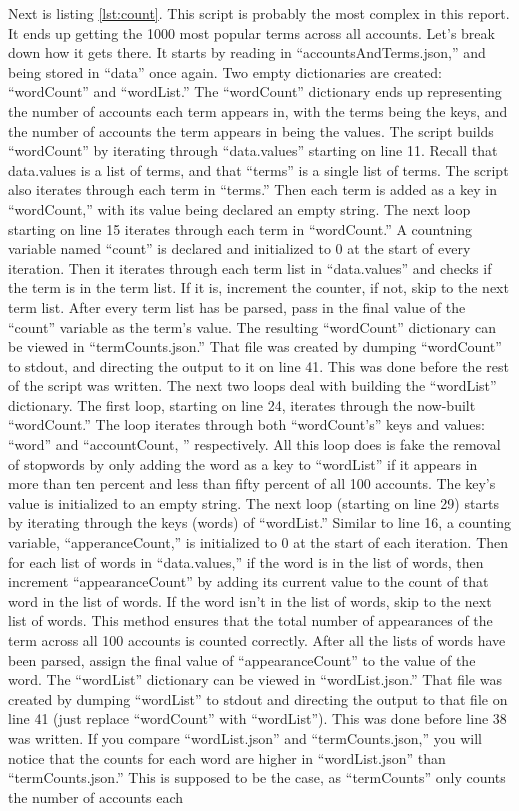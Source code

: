 \documentclass[12pt]{article}
\begin{document}
Next is listing \ref{lst:count}.  This script is probably the most complex in this report.  It ends up getting the 1000 most popular terms across all accounts.  Let's break down how it gets there.  It starts by reading in ``accountsAndTerms.json,'' and being stored in ``data'' once again.  Two empty dictionaries are created: ``wordCount'' and ``wordList.''  The ``wordCount'' dictionary ends up representing the number of accounts each term appears in, with the terms being the keys, and the number of accounts the term appears in being the values.  The script builds ``wordCount'' by iterating through ``data.values'' starting on line 11.  Recall that data.values is a list of terms, and that ``terms'' is a single list of terms.  The script also iterates through each term in ``terms.''  Then each term is added as a key in ``wordCount,'' with its value being declared an empty string.  The next loop starting on line 15 iterates through each term in ``wordCount.''  A countning variable named ``count'' is declared and initialized to 0 at the start of every iteration.  Then it iterates through each term list in ``data.values'' and checks if the term is in the term list.  If it is, increment the counter, if not, skip to the next term list.  After every term list has be parsed, pass in the final value of the ``count'' variable as the term's value.  The resulting ``wordCount'' dictionary can be viewed in ``termCounts.json.''  That file was created by dumping ``wordCount'' to stdout, and directing the output to it on line 41.  This was done before the rest of the script was written.  The next two loops deal with building the ``wordList'' dictionary.  The first loop, starting on line 24, iterates through the now-built ``wordCount.''  The loop iterates through both ``wordCount's'' keys and values: ``word'' and ``accountCount, '' respectively.  All this loop does is fake the removal of stopwords by only adding the word as a key to ``wordList'' if it appears in more than ten percent and less than fifty percent of all 100 accounts.  The key's value is initialized to an empty string.  The next loop (starting on line 29) starts by iterating through the keys (words) of ``wordList.''  Similar to line 16, a counting variable, ``apperanceCount,'' is initialized to 0 at the start of each iteration.  Then for each list of words in ``data.values,'' if the word is in the list of words, then increment ``appearanceCount'' by adding its current value to the count of that word in the list of words.  If the word isn't in the list of words, skip to the next list of words.  This method ensures that the total number of appearances of the term across all 100 accounts is counted correctly.  After all the lists of words have been parsed, assign the final value of ``appearanceCount'' to the value of the word.  The ``wordList'' dictionary can be viewed in ``wordList.json.''  That file was created by dumping ``wordList'' to stdout and directing the output to that file on line 41 (just replace ``wordCount'' with ``wordList'').  This was done before line 38 was written.  If you compare ``wordList.json'' and ``termCounts.json,'' you will notice that the counts for each word are higher in ``wordList.json'' than ``termCounts.json.''  This is supposed to be the case, as ``termCounts'' only counts the number of accounts each 
\end{document}

